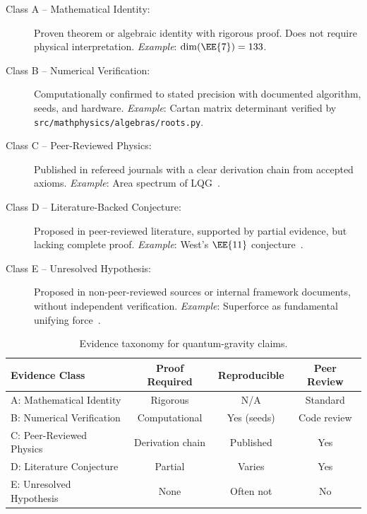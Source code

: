 \begin{definition}
\label{def:evidence_classes}
\begin{description}
    \item[Class A -- Mathematical Identity:]
        Proven theorem or algebraic identity with rigorous proof.
        Does not require physical interpretation.
        \emph{Example}: $\dim(\EE{7}) = 133$.

    \item[Class B -- Numerical Verification:]
        Computationally confirmed to stated precision with documented
        algorithm, seeds, and hardware.
        \emph{Example}: Cartan matrix determinant verified by
        \texttt{src/mathphysics/algebras/roots.py}.

    \item[Class C -- Peer-Reviewed Physics:]
        Published in refereed journals with a clear derivation chain
        from accepted axioms.
        \emph{Example}: Area spectrum of LQG~\cite{rovelli1995discreteness}.

    \item[Class D -- Literature-Backed Conjecture:]
        Proposed in peer-reviewed literature, supported by partial evidence,
        but lacking complete proof.
        \emph{Example}: West's $\EE{11}$ conjecture~\cite{west2001e11}.

    \item[Class E -- Unresolved Hypothesis:]
        Proposed in non-peer-reviewed sources or internal framework
        documents, without independent verification.
        \emph{Example}: Superforce as fundamental unifying
        force~\cite{pais2023superforce}.
\end{description}
\end{definition}

\begin{table}[ht]
\centering
\begin{tabular}{lccc}
\toprule
\textbf{Evidence Class} & \textbf{Proof Required} &
\textbf{Reproducible} & \textbf{Peer Review} \\
\midrule
A: Mathematical Identity & Rigorous & N/A & Standard \\
B: Numerical Verification & Computational & Yes (seeds) & Code review \\
C: Peer-Reviewed Physics & Derivation chain & Published & Yes \\
D: Literature Conjecture & Partial & Varies & Yes \\
E: Unresolved Hypothesis & None & Often not & No \\
\bottomrule
\end{tabular}
\caption{Evidence taxonomy for quantum-gravity claims.}
\label{tab:evidence_taxonomy}
\end{table}

